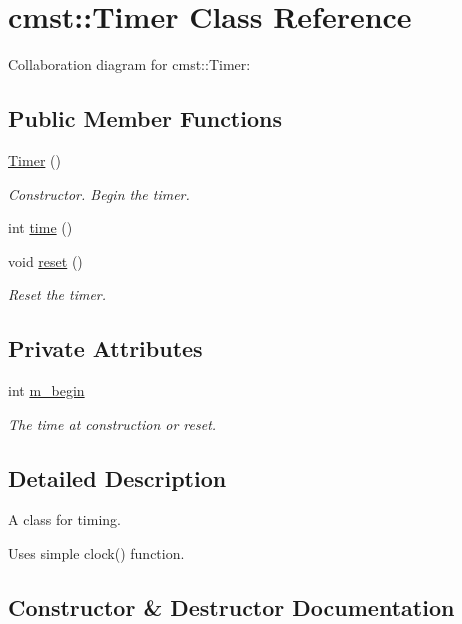 \hypertarget{classcmst_1_1_timer}{}\section{cmst::Timer Class Reference}
\label{classcmst_1_1_timer}


Collaboration diagram for cmst::Timer:
\subsection*{Public Member Functions}
\begin{DoxyCompactItemize}
\item 
\hyperlink{classcmst_1_1_timer_a92455552cedec79b452d3a0f89a0e32e}{Timer} ()
\begin{DoxyCompactList}\small\item\em Constructor. Begin the timer. \end{DoxyCompactList}\item 
int \hyperlink{classcmst_1_1_timer_af0145067ee61560f2363dc4a1cb552b9}{time} ()
\item 
void \hyperlink{classcmst_1_1_timer_a8c7011cc646563211b681249df6dd4cf}{reset} ()
\begin{DoxyCompactList}\small\item\em Reset the timer. \end{DoxyCompactList}\end{DoxyCompactItemize}
\subsection*{Private Attributes}
\begin{DoxyCompactItemize}
\item 
int \hyperlink{classcmst_1_1_timer_a0fa8671c0b1dc3efca0f4dc5dfe98fc2}{m\_begin}
\begin{DoxyCompactList}\small\item\em The time at construction or reset. \end{DoxyCompactList}\end{DoxyCompactItemize}


\subsection{Detailed Description}
A class for timing.

Uses simple clock() function. 

\subsection{Constructor \& Destructor Documentation}
